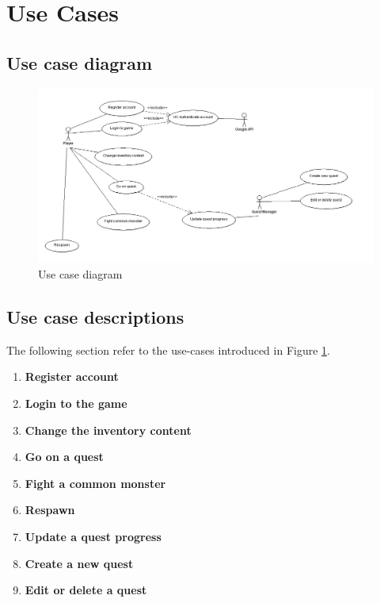 \section{Use Cases}

	\subsection{Use case diagram}
	
		\begin{figure}[h]	
			\includegraphics[width=\textwidth]{figures/UseCaseDiagram}
			\centering			
			\caption{Use case diagram}
			\label{fig:usecasediagram}
		\end{figure}
	
	\subsection{Use case descriptions}
		The following section refer to the use-cases introduced in Figure \ref{fig:usecasediagram}.
		\begin{enumerate}
			\item \textbf{Register account} \\
			\item \textbf{Login to the game} \\
			\item \textbf{Change the inventory content} \\
			\item \textbf{Go on a quest} \\
			\item \textbf{Fight a common monster} \\
			\item \textbf{Respawn} \\
			\item \textbf{Update a quest progress} \\
			\item \textbf{Create a new quest} \\
			\item \textbf{Edit or delete a quest} \\
						
		\end{enumerate}
	
